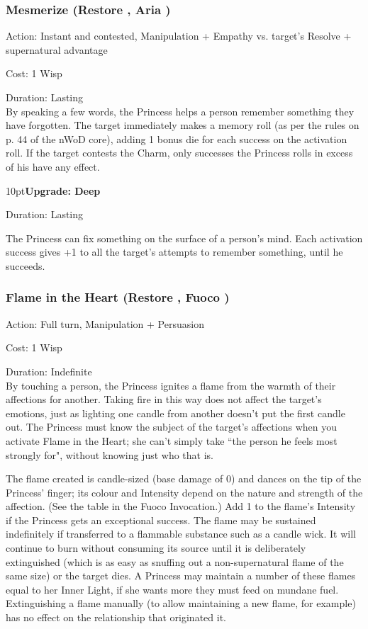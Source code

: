 \subsubsection*{Mesmerize (Restore \textbullet\textbullet, Aria \textbullet)}

\noindent Action: Instant and contested, Manipulation + Empathy vs. target's Resolve + supernatural advantage

\noindent Cost: 1 Wisp

\noindent Duration: Lasting \\

\noindent By speaking a few words, the Princess helps a person remember something they have forgotten. The target immediately makes a memory roll (as per the rules on p. 44 of the nWoD core), adding 1 bonus die for each success on the activation roll. If the target contests the Charm, only successes the Princess rolls in excess of his have any effect.
\begin{myindentpar}{10pt}\textbf{Upgrade: Deep}

\noindent Duration: Lasting

The Princess can fix something on the surface of a person's mind. Each activation success gives +1 to all the target's attempts to remember something, until he succeeds.\end{myindentpar}

\subsubsection*{Flame in the Heart (Restore \textbullet\textbullet, Fuoco \textbullet)}

\noindent Action: Full turn, Manipulation + Persuasion

\noindent Cost: 1 Wisp

\noindent Duration: Indefinite \\

\noindent By touching a person, the Princess ignites a flame from the warmth of their affections for another. Taking fire in this way does not affect the target's emotions, just as lighting one candle from another doesn't put the first candle out. The Princess must know the subject of the target's affections when you activate Flame in the Heart; she can't simply take \textquotedblleft the person he feels most strongly for", without knowing just who that is.

The flame created is candle-sized (base damage of 0) and dances on the tip of the Princess' finger; its colour and Intensity depend on the nature and strength of the affection. (See the table in the Fuoco Invocation.) Add 1 to the flame's Intensity if the Princess gets an exceptional success. The flame may be sustained indefinitely if transferred to a flammable substance such as a candle wick. It will continue to burn without consuming its source until it is deliberately extinguished (which is as easy as snuffing out a non-supernatural flame of the same size) or the target dies. A Princess may maintain a number of these flames equal to her Inner Light, if she wants more they must feed on mundane fuel. Extinguishing a flame manually (to allow maintaining a new flame, for example) has no effect on the relationship that originated it.

